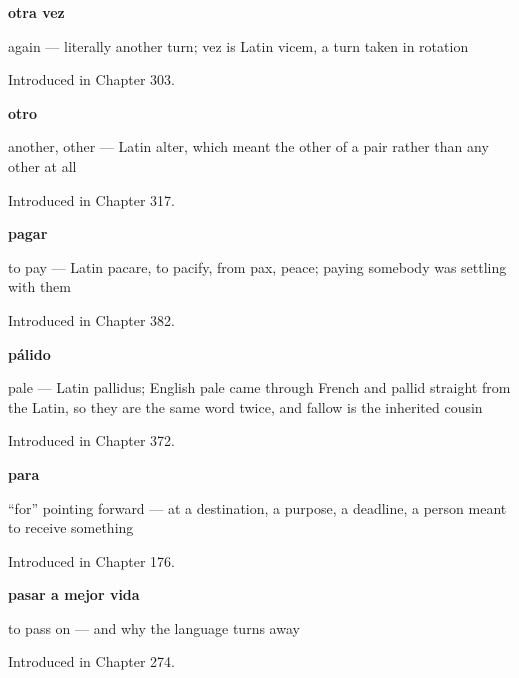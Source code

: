 \noindent\begin{minipage}[t]{\linewidth}
\raggedright
\textbf{otra vez}\par
\small again — literally another turn; vez is Latin vicem, a turn taken in rotation\par
\footnotesize Introduced in Chapter 303.
\end{minipage}\par\medskip

\noindent\begin{minipage}[t]{\linewidth}
\raggedright
\textbf{otro}\par
\small another, other — Latin alter, which meant the other of a pair rather than any other at all\par
\footnotesize Introduced in Chapter 317.
\end{minipage}\par\medskip

\noindent\begin{minipage}[t]{\linewidth}
\raggedright
\textbf{pagar}\par
\small to pay — Latin pacare, to pacify, from pax, peace; paying somebody was settling with them\par
\footnotesize Introduced in Chapter 382.
\end{minipage}\par\medskip

\noindent\begin{minipage}[t]{\linewidth}
\raggedright
\textbf{pálido}\par
\small pale — Latin pallidus; English pale came through French and pallid straight from the Latin, so they are the same word twice, and fallow is the inherited cousin\par
\footnotesize Introduced in Chapter 372.
\end{minipage}\par\medskip

\noindent\begin{minipage}[t]{\linewidth}
\raggedright
\textbf{para}\par
\small \textquotedblleft{}for\textquotedblright{} pointing forward — at a destination, a purpose, a deadline, a person meant to receive something\par
\footnotesize Introduced in Chapter 176.
\end{minipage}\par\medskip

\noindent\begin{minipage}[t]{\linewidth}
\raggedright
\textbf{pasar a mejor vida}\par
\small to pass on — and why the language turns away\par
\footnotesize Introduced in Chapter 274.
\end{minipage}\par\medskip

